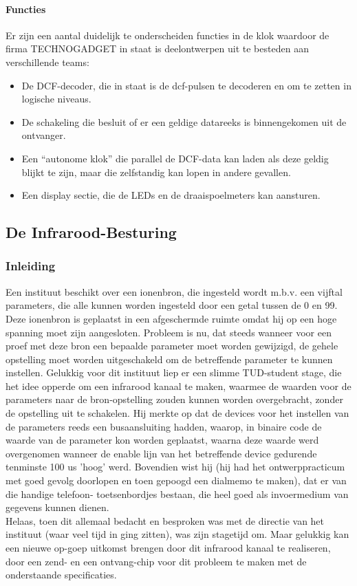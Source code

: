 \paragraph{Functies}

Er zijn een aantal duidelijk te onderscheiden functies in de klok
waardoor de firma TECHNOGADGET in staat is deelontwerpen uit te besteden
aan verschillende teams:
\begin{itemize}
\item
De DCF-decoder, die in staat is de dcf-pulsen te decoderen en om te zetten in logische niveaus.
\item
De schakeling die besluit of er een geldige datareeks is binnengekomen uit
de ontvanger.
\item
Een ``autonome klok'' die parallel de DCF-data kan laden als deze geldig blijkt te zijn, maar die zelfstandig kan lopen in andere gevallen.
\item
Een display sectie, die de LEDs en de draaispoelmeters kan aansturen.
\end{itemize}

\subsection{De Infrarood-Besturing}
\subsubsection{Inleiding}
Een instituut beschikt over een ionenbron, die ingesteld wordt m.b.v.
een vijftal parameters, die alle kunnen worden ingesteld door een
getal tussen de 0 en 99. Deze ionenbron is geplaatst in een afgeschermde
ruimte omdat hij op een hoge spanning moet zijn aangesloten.
Probleem is nu, dat steeds wanneer voor een proef met deze bron een
bepaalde parameter moet worden gewijzigd, de gehele opstelling moet worden
uitgeschakeld om de betreffende parameter te kunnen instellen.
Gelukkig voor dit instituut liep er een slimme TUD-student stage, die
het idee opperde om een infrarood kanaal te maken, waarmee de waarden voor
de parameters naar de bron-opstelling zouden kunnen worden overgebracht,
zonder de opstelling uit te schakelen.
Hij merkte op dat de devices voor het instellen van de parameters
reeds een busaansluiting hadden, waarop, in binaire code de waarde van
de parameter kon worden geplaatst, waarna deze waarde werd overgenomen wanneer
de enable lijn van het betreffende device gedurende tenminste
100 us 'hoog' werd.
Bovendien wist hij (hij had het ontwerppracticum met goed gevolg doorlopen
en toen gepoogd een dialmemo te maken), dat er van die handige telefoon-
toetsenbordjes bestaan, die heel goed als invoermedium van gegevens kunnen
dienen.\\
Helaas, toen dit allemaal bedacht en besproken was met de directie van het
instituut (waar veel tijd in ging zitten), was zijn stagetijd om.
Maar gelukkig kan een nieuwe op-goep uitkomst brengen door dit
infrarood kanaal te realiseren, door een zend- en een ontvang-chip
voor dit probleem te maken met de onderstaande specificaties.
